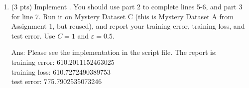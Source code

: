 \documentclass[10pt,letter,notitlepage]{article}
\newcommand{\ans}[1]{{\color{orange}\textsf{Ans}: #1}}
\newcounter{exercise}
\begin{document}
\begin{exercise}
\begin{enumerate}
	
\item (3 pts) Implement . You should use part 2 to complete lines 5-6, and part 3 for line 7. 
Run it on Mystery Dataset C (this is Mystery Dataset A from Assignment 1, but reused), and report your training error, training loss, and test error. Use $C=1$ and $\varepsilon = 0.5$.

\ans{
  Please see the implementation in the script file. The report is: \\
  training error: 610.2011152463025 \\
  training loss: 610.7272490389753 \\
  test error: 775.7902535073246
} 

\end{enumerate}
\end{exercise}
\end{document}
